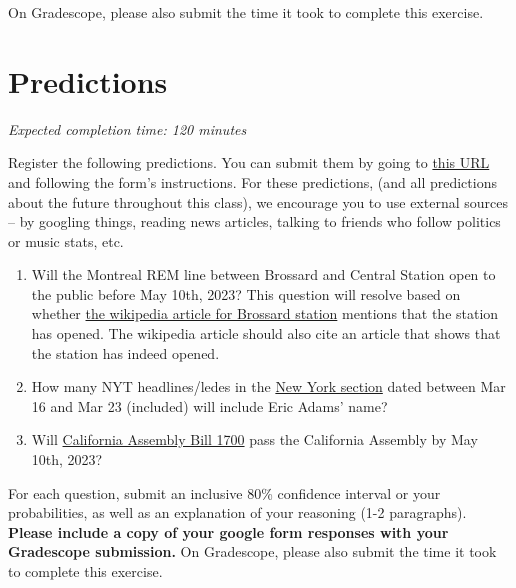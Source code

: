 \documentclass[11pt]{article}
\begin{document}
On Gradescope, please also submit the time it took to complete this exercise.

\section*{Predictions}

\emph{Expected completion time: 120 minutes} 

Register the following predictions. You can submit them by going to \href{https://docs.google.com/forms/d/1zfza4lPpQWRJDRBghY6a9-HK3erBo32wJBQy-BGfhBA/edit}{this URL} and following the form's instructions. For these predictions, (and all predictions about the future throughout this class), we encourage you to use external sources -- by googling things, reading news articles, talking to friends who follow politics or music stats, etc.

\begin{enumerate}
	\item Will the Montreal REM line between Brossard and Central Station open to the public before May 10th, 2023? This question will resolve based on whether \href{https://en.wikipedia.org/wiki/Brossard_station}{the wikipedia article for Brossard station} mentions that the station has opened. The wikipedia article should also cite an article that shows that the station has indeed opened.
	\item How many NYT headlines/ledes in the \href{https://www.nytimes.com/section/nyregion}{New York section} dated between Mar 16 and Mar 23 (included) will include Eric Adams' name? 
	\item Will \href{https://leginfo.legislature.ca.gov/faces/billNavClient.xhtml?bill_id=202320240AB1700}{California Assembly Bill 1700} pass the California Assembly by May 10th, 2023?
\end{enumerate}

For each question, submit an inclusive 80\% confidence interval or your probabilities, as well as an explanation of your reasoning (1-2 paragraphs). \textbf{Please include a copy of your google form responses with your Gradescope submission.} On Gradescope, please also submit the time it took to complete this exercise.
\end{document}
